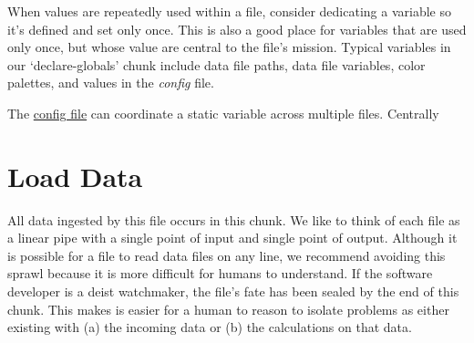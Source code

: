 \documentclass[
]{book}
\newenvironment{Shaded}{\begin{snugshade}}{\end{snugshade}}
\newcommand{\CommentTok}[1]{\textcolor[rgb]{0.56,0.35,0.01}{\textit{#1}}}
\newcommand{\DataTypeTok}[1]{\textcolor[rgb]{0.13,0.29,0.53}{#1}}
\newcommand{\KeywordTok}[1]{\textcolor[rgb]{0.13,0.29,0.53}{\textbf{#1}}}
\newcommand{\NormalTok}[1]{#1}
\newcommand{\OperatorTok}[1]{\textcolor[rgb]{0.81,0.36,0.00}{\textbf{#1}}}
\newcommand{\StringTok}[1]{\textcolor[rgb]{0.31,0.60,0.02}{#1}}
\begin{document}
When values are repeatedly used within a file, consider dedicating a variable so it's defined and set only once. This is also a good place for variables that are used only once, but whose value are central to the file's mission. Typical variables in our `declare-globals' chunk include data file paths, data file variables, color palettes, and values in the \emph{config} file.

The \protect\hyperlink{repo-root}{config file} can coordinate a static variable across multiple files. Centrally

\begin{Shaded}
\end{Shaded}

\hypertarget{chunk-load-data}{%
\section{Load Data}\label{chunk-load-data}}

All data ingested by this file occurs in this chunk. We like to think of each file as a linear pipe with a single point of input and single point of output. Although it is possible for a file to read data files on any line, we recommend avoiding this sprawl because it is more difficult for humans to understand. If the software developer is a deist watchmaker, the file's fate has been sealed by the end of this chunk. This makes is easier for a human to reason to isolate problems as either existing with (a) the incoming data or (b) the calculations on that data.
\end{document}
